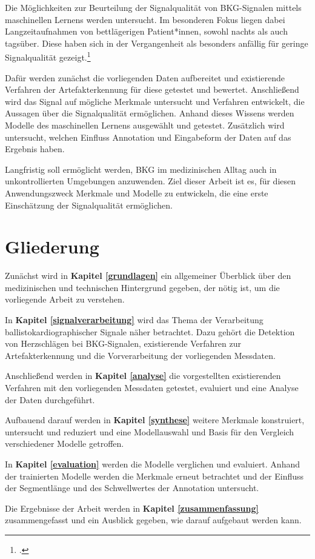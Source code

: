 Die Möglichkeiten zur Beurteilung der Signalqualität von \ac{BKG}-Signalen mittels maschinellen Lernens werden untersucht. Im besonderen Fokus liegen dabei Langzeitaufnahmen von bettlägerigen Patient*innen, sowohl nachts als auch tagsüber. Diese  haben sich in der Vergangenheit als besonders anfällig für geringe Signalqualität gezeigt.\footcite{HoogAntink2020}

Dafür werden zunächst die vorliegenden Daten aufbereitet und existierende Verfahren der Artefakterkennung für diese getestet und bewertet. Anschließend wird das Signal auf mögliche Merkmale untersucht und Verfahren entwickelt, die Aussagen über die Signalqualität ermöglichen. Anhand dieses Wissens werden Modelle des maschinellen Lernens ausgewählt und getestet. Zusätzlich wird untersucht, welchen Einfluss Annotation und Eingabeform der Daten auf das Ergebnis haben.

Langfristig soll ermöglicht werden, \acf{BKG} im medizinischen Alltag auch in unkontrollierten Umgebungen anzuwenden. Ziel dieser Arbeit ist es, für diesen Anwendungszweck Merkmale und Modelle zu entwickeln, die eine erste Einschätzung der Signalqualität ermöglichen.

\section{Gliederung}

Zunächst wird in \textbf{Kapitel \ref{grundlagen}} ein allgemeiner Überblick über den medizinischen und technischen Hintergrund gegeben, der nötig ist, um die vorliegende Arbeit zu verstehen.

In \textbf{Kapitel \ref{signalverarbeitung}} wird das Thema der Verarbeitung ballistokardiographischer Signale näher betrachtet. Dazu gehört die Detektion von Herzschlägen bei \ac{BKG}-Signalen, existierende Verfahren zur Artefakterkennung und die Vorverarbeitung der vorliegenden Messdaten.

Anschließend werden in \textbf{Kapitel \ref{analyse}} die vorgestellten existierenden Verfahren mit den vorliegenden Messdaten getestet, evaluiert und eine Analyse der Daten durchgeführt.

Aufbauend darauf werden in \textbf{Kapitel \ref{synthese}} weitere Merkmale konstruiert, untersucht und reduziert und eine Modellauswahl und Basis für den Vergleich verschiedener Modelle getroffen.

In \textbf{Kapitel \ref{evaluation}} werden die Modelle verglichen und evaluiert. Anhand der trainierten Modelle werden die Merkmale erneut betrachtet und der Einfluss der Segmentlänge und des Schwellwertes der Annotation untersucht.

Die Ergebnisse der Arbeit werden in \textbf{Kapitel \ref{zusammenfassung}} zusammengefasst und ein Ausblick gegeben, wie darauf aufgebaut werden kann.